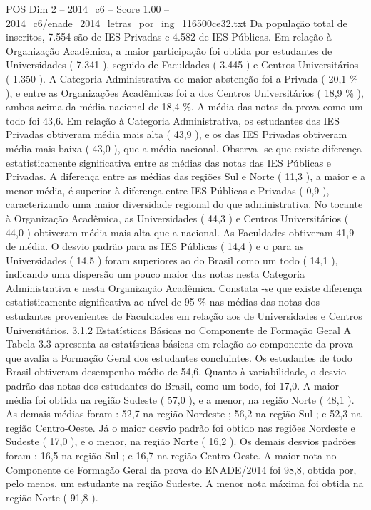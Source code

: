 \begin{textsample}{POS Dim 2 – 2014\_c6 – Score 1.00 – 2014\_c6/enade\_2014\_letras\_por\_ing\_116500ce32.txt}
Da população total de inscritos, 7.554 são de IES Privadas e 4.582 de IES Públicas.
Em relação à Organização Acadêmica, a maior participação foi obtida por estudantes de Universidades ( 7.341 ), seguido de Faculdades ( 3.445 ) e Centros Universitários ( 1.350 ).
A Categoria Administrativa de maior abstenção foi a Privada ( 20,1 \% ), e entre as Organizações Acadêmicas foi a dos Centros Universitários ( 18,9 \% ), ambos acima da média nacional de 18,4 \%.
A média das notas da prova como um todo foi 43,6.
Em relação à Categoria Administrativa, os estudantes das IES Privadas obtiveram média mais alta ( 43,9 ), e os das IES Privadas obtiveram média mais baixa ( 43,0 ), que a média nacional.
Observa -se que existe diferença estatisticamente significativa entre as médias das notas das IES Públicas e Privadas.
A diferença entre as médias das regiões Sul e Norte ( 11,3 ), a maior e a menor média, é superior à diferença entre IES Públicas e Privadas ( 0,9 ), caracterizando uma maior diversidade regional do que administrativa.
No tocante à Organização Acadêmica, as Universidades ( 44,3 ) e Centros Universitários ( 44,0 ) obtiveram média mais alta que a nacional.
As Faculdades obtiveram 41,9 de média.
O desvio padrão para as IES Públicas ( 14,4 ) e o para as Universidades ( 14,5 ) foram superiores ao do Brasil como um todo ( 14,1 ), indicando uma dispersão um pouco maior das notas nesta Categoria Administrativa e nesta Organização Acadêmica.
Constata -se que existe diferença estatisticamente significativa ao nível de 95 \% nas médias das notas dos estudantes provenientes de Faculdades em relação aos de Universidades e Centros Universitários. 3.1.2 Estatísticas Básicas no Componente de Formação Geral A Tabela 3.3 apresenta as estatísticas básicas em relação ao componente da prova que avalia a Formação Geral dos estudantes concluintes.
Os estudantes de todo Brasil obtiveram desempenho médio de 54,6.
Quanto à variabilidade, o desvio padrão das notas dos estudantes do Brasil, como um todo, foi 17,0.
A maior média foi obtida na região Sudeste ( 57,0 ), e a menor, na região Norte ( 48,1 ).
As demais médias foram : 52,7 na região Nordeste ; 56,2 na região Sul ; e 52,3 na região Centro-Oeste.
Já o maior desvio padrão foi obtido nas regiões Nordeste e Sudeste ( 17,0 ), e o menor, na região Norte ( 16,2 ).
Os demais desvios padrões foram : 16,5 na região Sul ; e 16,7 na região Centro-Oeste.
A maior nota no Componente de Formação Geral da prova do ENADE/2014 foi 98,8, obtida por, pelo menos, um estudante na região Sudeste.
A menor nota máxima foi obtida na região Norte ( 91,8 ).

\end{textsample}
